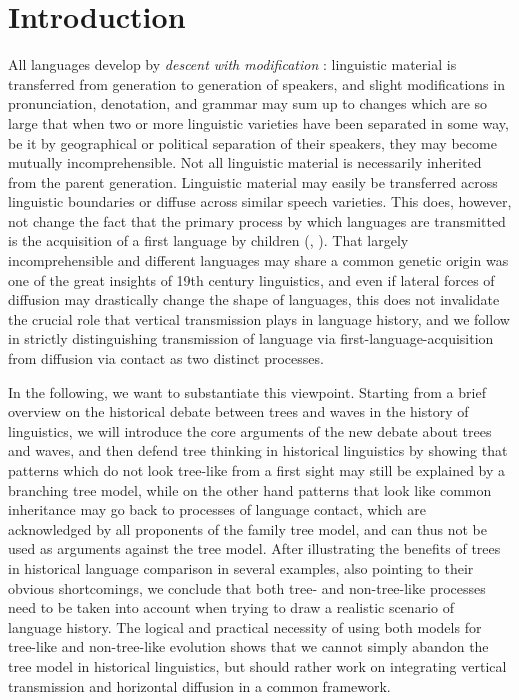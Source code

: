 \documentclass[svgnames,12pt]{scrartcl}
\begin{document}
\section{Introduction}
All languages develop by \emph{descent with modification} \citep{Darwin1859}: linguistic material is transferred from
generation to generation of speakers, and slight modifications in pronunciation, denotation, and
grammar may sum up to changes which are so large that when two or more linguistic varieties have
been separated in some way, be it by geographical or political separation of their speakers, they
may become mutually incomprehensible. Not all linguistic material is necessarily inherited from the
parent generation. Linguistic material may easily be transferred across linguistic boundaries or
diffuse across similar speech varieties. This does, however, not change the fact that the primary
process by which languages are transmitted is the acquisition of a first language by children
(\citealt[61]{Ringe2002}, \citealt[27-48]{Hale2007}). That largely incomprehensible and different languages may share a common
genetic origin was one of the great insights of 19th century linguistics, and even if lateral forces
of diffusion may drastically change the shape of languages, this does not invalidate the crucial
role that vertical transmission plays in language history, and we follow \citet[347]{Labov2007} in
strictly distinguishing transmission of language via first-language-acquisition from diffusion via
contact as two distinct processes. 
 
In the following, we want to substantiate this viewpoint. Starting from a brief overview on the
historical debate between trees and waves in the history of linguistics, we will introduce the core
arguments of the new debate about trees and waves, and then defend tree thinking in historical
linguistics by showing that patterns which do not look tree-like from a first sight may still be
explained by a branching tree model, while on the other hand patterns that look like common
inheritance may go back to processes of language contact, which are acknowledged by all proponents
of the family tree model, and can thus not be used as arguments against the tree model.
After illustrating the benefits of trees in historical language comparison in several examples, also
pointing to their obvious shortcomings, we conclude
that both tree- and non-tree-like processes need to be taken into account when trying to draw a
realistic scenario of language history. The logical and practical necessity of using both models for
tree-like and non-tree-like evolution shows that we cannot simply abandon the tree model in
historical linguistics, but should rather work on integrating vertical transmission and horizontal
diffusion in a common framework.
\end{document}
